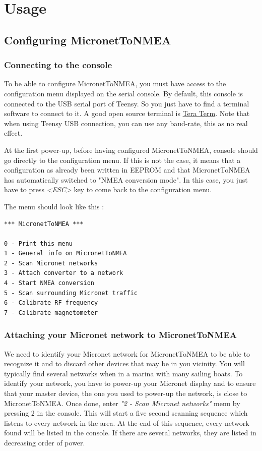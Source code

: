 \documentclass{report}
\begin{document}
\chapter{Usage}

\section{Configuring MicronetToNMEA}

\subsection{Connecting to the console}

To be able to configure MicronetToNMEA, you must have access to the configuration menu displayed on the serial console. By default, this console is connected to the USB serial port of Teensy. So you just have to find a terminal software to connect to it. A good open source terminal is \href{http://www.teraterm.org/}{Tera Term}. Note that when using Teensy USB connection, you can use any baud-rate, this as no real effect.

At the first power-up, before having configured MicronetToNMEA, console should go directly to the configuration menu. If this is not the case, it means that a configuration as already been written in EEPROM and that MicronetToNMEA has automatically switched to "NMEA conversion mode". In this case, you just have to press \emph{<ESC>} key to come back to the configuration menu.

The menu should look like this :

\begin{verbatim}
*** MicronetToNMEA ***

0 - Print this menu
1 - General info on MicronetToNMEA
2 - Scan Micronet networks
3 - Attach converter to a network
4 - Start NMEA conversion
5 - Scan surrounding Micronet traffic
6 - Calibrate RF frequency
7 - Calibrate magnetometer
\end{verbatim}

\subsection{Attaching your Micronet network to MicronetToNMEA}

We need to identify your Micronet network for MicronetToNMEA to be able to recognize it and to discard other devices that may be in you vicinity. You will typically find several networks when in a marina with many sailing boats.
To identify your network, you have to power-up your Micronet display and to ensure that your master device, the one you used to power-up the network, is close to MicronetToNMEA. Once done, enter \emph{"2 - Scan Micronet networks"} menu by pressing 2 in the console. This will start a five second scanning sequence which listens to every network in the area. At the end of this sequence, every network found will be listed in the console. If there are several networks, they are listed in decreasing order of power.
\end{document}
